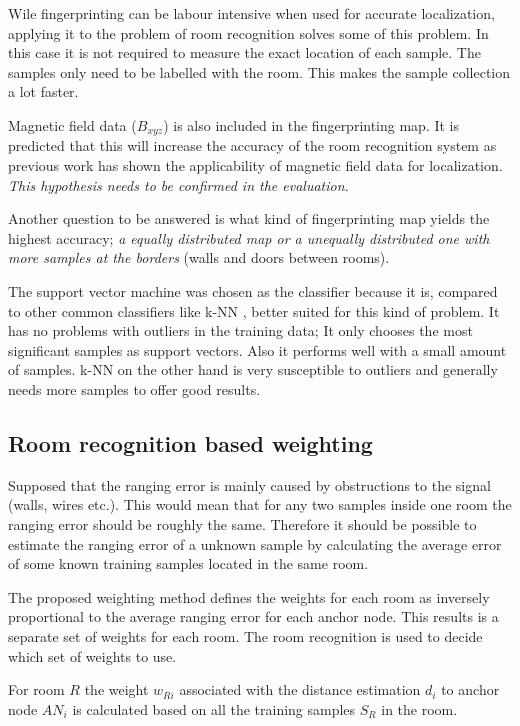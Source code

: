 Wile fingerprinting can be labour intensive when used for accurate localization, applying it to the problem of room recognition solves some of this problem. In this case it is not required to measure the exact location of each sample. The samples only need to be labelled with the room. This makes the sample collection a lot faster.

Magnetic field data ($B_{xyz}$) is also included in the fingerprinting map. It is predicted that this will increase the accuracy of the room recognition system as previous work has shown the applicability of  magnetic field data for localization. \emph{This hypothesis needs to be confirmed in the evaluation.}

Another question to be answered is what kind of fingerprinting map yields the highest accuracy; \emph{a equally distributed map or a unequally distributed one with more samples at the borders }(walls and doors between rooms).

The support vector machine was chosen as the classifier because it is, compared to other common classifiers like k-NN , better suited for this kind of problem. It has no problems with outliers in the training data; It only chooses the most significant samples as support vectors. Also it performs well with a small amount of samples. k-NN on the other hand is very susceptible to outliers and generally needs more samples to offer good results.

\subsection{Room recognition based weighting}
\label{WeightingModelDefinition}
Supposed that the ranging error is mainly caused by obstructions to the signal (walls, wires etc.). This would mean that for any two samples inside one room the ranging error should be roughly the same. Therefore it should be possible to estimate the ranging error of a unknown sample by calculating the average error of some known training samples located in the same room.

The proposed weighting method defines the weights for each room as inversely proportional to the average ranging error for each anchor node. This results is a separate set of weights for each room. The room recognition is used to decide which set of weights to use.

For room $R$ the weight $w_{Ri}$ associated with the distance estimation $d_i$ to anchor node $AN_i$ is calculated based on all the training samples $S_R$ in the room.

